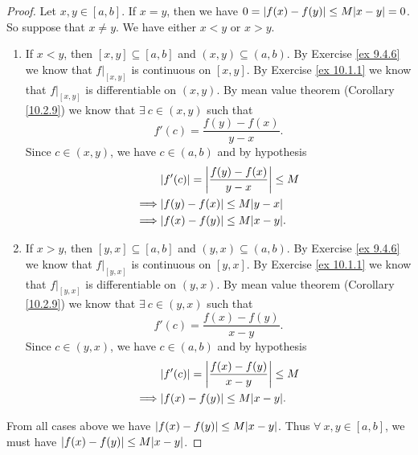 \begin{proof}
    Let \(x, y \in [a, b]\).
    If \(x = y\), then we have \(0 = \abs*{f(x) - f(y)} \leq M \abs*{x - y} = 0\).
    So suppose that \(x \neq y\).
    We have either \(x < y\) or \(x > y\).
    \begin{enumerate}
        \item If \(x < y\), then \([x, y] \subseteq [a, b]\) and \((x, y) \subseteq (a, b)\).
              By Exercise \ref{ex 9.4.6} we know that \(f|_{[x, y]}\) is continuous on \([x, y]\).
              By Exercise \ref{ex 10.1.1} we know that \(f|_{[x, y]}\) is differentiable on \((x, y)\).
              By mean value theorem (Corollary \ref{10.2.9}) we know that \(\exists\ c \in (x, y)\) such that
              \[
                  f'(c) = \frac{f(y) - f(x)}{y - x}.
              \]
              Since \(c \in (x, y)\), we have \(c \in (a, b)\) and by hypothesis
              \begin{align*}
                           & \abs*{f'(c)} = \abs*{\frac{f(y) - f(x)}{y - x}} \leq M \\
                  \implies & \abs*{f(y) - f(x)} \leq M \abs*{y - x}                 \\
                  \implies & \abs*{f(x) - f(y)} \leq M \abs*{x - y}.
              \end{align*}
        \item If \(x > y\), then \([y, x] \subseteq [a, b]\) and \((y, x) \subseteq (a, b)\).
              By Exercise \ref{ex 9.4.6} we know that \(f|_{[y, x]}\) is continuous on \([y, x]\).
              By Exercise \ref{ex 10.1.1} we know that \(f|_{[y, x]}\) is differentiable on \((y, x)\).
              By mean value theorem (Corollary \ref{10.2.9}) we know that \(\exists\ c \in (y, x)\) such that
              \[
                  f'(c) = \frac{f(x) - f(y)}{x - y}.
              \]
              Since \(c \in (y, x)\), we have \(c \in (a, b)\) and by hypothesis
              \begin{align*}
                           & \abs*{f'(c)} = \abs*{\frac{f(x) - f(y)}{x - y}} \leq M \\
                  \implies & \abs*{f(x) - f(y)} \leq M \abs*{x - y}.
              \end{align*}
    \end{enumerate}
    From all cases above we have \(\abs*{f(x) - f(y)} \leq M \abs*{x - y}\).
    Thus \(\forall\ x, y \in [a, b]\), we must have \(\abs*{f(x) - f(y)} \leq M \abs*{x - y}\).
\end{proof}

